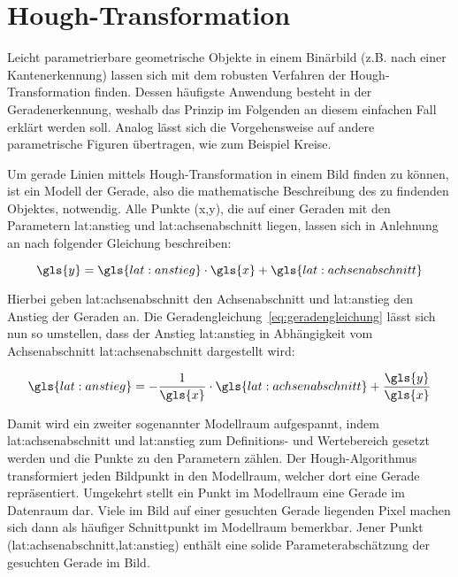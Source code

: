 \section{Hough-Transformation \dcfirstauthorshort}
\label{sec:grundlagen:hough}

Leicht parametrierbare geometrische Objekte in einem Binärbild (z.B. nach einer Kantenerkennung) lassen sich mit dem robusten Verfahren der Hough-Transformation finden. Dessen häufigste Anwendung besteht in der Geradenerkennung, weshalb das Prinzip im Folgenden an diesem einfachen Fall erklärt werden soll. Analog lässt sich die Vorgehensweise auf andere parametrische Figuren übertragen, wie zum Beispiel Kreise.

Um gerade Linien mittels Hough-Transformation in einem Bild finden zu können, ist ein Modell der Gerade, also die mathematische Beschreibung des zu findenden Objektes, notwendig. Alle Punkte (\gls{x},\gls{y}), die auf einer Geraden mit den Parametern \gls{lat:anstieg} und \gls{lat:achsenabschnitt} liegen, lassen sich in Anlehnung an \autocite[S.~481f]{jaehneDigitaleBildverarbeitungMit2005} nach folgender Gleichung beschreiben:

\begin{equation}
\gls{y} = \gls{lat:anstieg} \cdot \gls{x} + \gls{lat:achsenabschnitt}
\label{eq:geradengleichung}
\end{equation}

Hierbei geben \gls{lat:achsenabschnitt} den Achsenabschnitt und \gls{lat:anstieg} den Anstieg der Geraden an. Die Geradengleichung~\eqref{eq:geradengleichung} lässt sich nun so umstellen, dass der Anstieg \gls{lat:anstieg} in Abhängigkeit vom Achsenabschnitt \gls{lat:achsenabschnitt}  dargestellt wird:

\begin{equation}
\gls{lat:anstieg} = -\frac{1}{\gls{x}} \cdot \gls{lat:achsenabschnitt} + \frac{\gls{y}}{\gls{x}}
\end{equation}

Damit wird ein zweiter sogenannter Modellraum aufgespannt, indem \gls{lat:achsenabschnitt} und \gls{lat:anstieg} zum Definitions- und Wertebereich gesetzt werden und die Punkte zu den Parametern zählen. Der Hough-Algorithmus transformiert jeden Bildpunkt in den Modellraum, welcher dort eine Gerade repräsentiert. Umgekehrt stellt ein Punkt im Modellraum eine Gerade im Datenraum dar. Viele im Bild auf einer gesuchten Gerade liegenden Pixel machen sich dann als häufiger Schnittpunkt im Modellraum bemerkbar. Jener Punkt (\gls{lat:achsenabschnitt},\gls{lat:anstieg}) enthält eine solide Parameterabschätzung der gesuchten Gerade im Bild.

